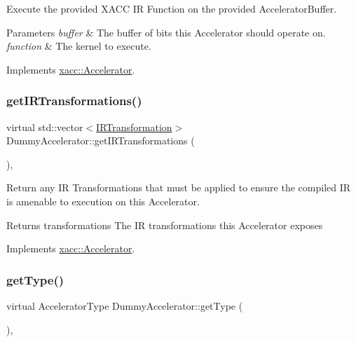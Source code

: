 Execute the provided X\+A\+CC IR Function on the provided Accelerator\+Buffer.


\begin{DoxyParams}{Parameters}
{\em buffer} & The buffer of bits this Accelerator should operate on. \\
\hline
{\em function} & The kernel to execute. \\
\hline
\end{DoxyParams}


Implements \hyperlink{a01084_a89b3f3e6294f228abf03a410b0fb1674}{xacc\+::\+Accelerator}.

\mbox{\label{a00976_aac0e2ae753064701468fa1188ac7549f}} 
\subsubsection{\texorpdfstring{get\+I\+R\+Transformations()}{getIRTransformations()}}
{\footnotesize\ttfamily virtual std\+::vector$<$\hyperlink{a01152}{I\+R\+Transformation}$>$ Dummy\+Accelerator\+::get\+I\+R\+Transformations (\begin{DoxyParamCaption}{ }\end{DoxyParamCaption})\hspace{0.3cm}{\ttfamily [inline]}, {\ttfamily [virtual]}}

Return any IR Transformations that must be applied to ensure the compiled IR is amenable to execution on this Accelerator.

\begin{DoxyReturn}{Returns}
transformations The IR transformations this Accelerator exposes 
\end{DoxyReturn}


Implements \hyperlink{a01084_ad6e4a642dcb24e552675bcbeff1e1b04}{xacc\+::\+Accelerator}.

\mbox{\label{a00976_acdfe3e856f2bacc9e0dc1a51782a52e3}} 
\subsubsection{\texorpdfstring{get\+Type()}{getType()}}
{\footnotesize\ttfamily virtual Accelerator\+Type Dummy\+Accelerator\+::get\+Type (\begin{DoxyParamCaption}{ }\end{DoxyParamCaption})\hspace{0.3cm}{\ttfamily [inline]}, {\ttfamily [virtual]}}


